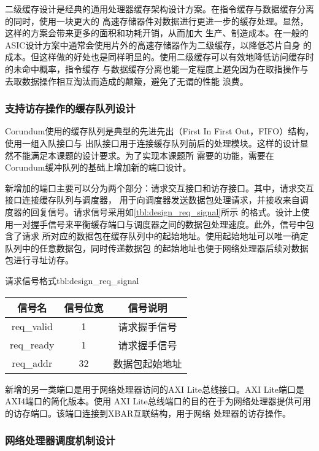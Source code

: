 二级缓存设计是经典的通用处理器缓存架构设计方案。在指令缓存与数据缓存分离的同时，使用一块更大的
高速存储器件对数据进行更进一步的缓存处理。显然，这样的方案会带来更多的面积和功耗开销，从而加大
生产、制造成本。在一般的ASIC设计方案中通常会使用片外的高速存储器作为二级缓存，以降低芯片自身
的成本。但这样做的好处也是同样明显的。使用二级缓存可以有效地降低访问缓存时的未命中概率，指令缓存
与数据缓存分离也能一定程度上避免因为在取指操作与去取数据操作相互淘汰而造成的颠簸，避免了无谓的性能
浪费。

\subsubsection{支持访存操作的缓存队列设计}

Corundum使用的缓存队列是典型的先进先出（First In First Out，FIFO）结构，使用一组入队接口与
出队接口用于连接缓存队列前后的处理模块。这样的设计显然不能满足本课题的设计要求。为了实现本课题所
需要的功能，需要在Corundum缓冲队列的基础上增加新的端口设计。

新增加的端口主要可以分为两个部分：请求交互接口和访存接口。其中，请求交互接口连接缓存队列与调度器，
用于向调度器发送数据包处理请求，并接收来自调度器的回复信号。请求信号采用如\autoref{tbl:design_req_signal}所示
的格式。设计上使用一对握手信号来平衡缓存端口与调度器之间的数据包处理速度。此外，信号中包含了请求
所对应的数据包在缓存队列中的起始地址。使用起始地址可以唯一确定队列中的任意数据包，同时传递数据包
的起始地址也便于网络处理器后续对数据包进行寻址访存。

\begin{generaltab}{请求信号格式}{tbl:design_req_signal}
  \begin{tabular}{ccc}
    \toprule
    信号名 & 信号位宽 & 信号说明 \\
    \midrule
    req\_valid & 1 & 请求握手信号 \\
    req\_ready & 1 & 请求握手信号 \\
    req\_addr & 32 & 数据包起始地址 \\
    \bottomrule
  \end{tabular}
\end{generaltab}

新增的另一类端口是用于网络处理器访问的AXI Lite总线接口。AXI Lite端口是AXI4端口的简化版本\cite{intro_amba_axi}。使用
AXI Lite总线端口的目的在于为网络处理器提供可用的访存端口。该端口连接到XBAR互联结构，用于网络
处理器的访存操作。

\subsubsection{网络处理器调度机制设计}

